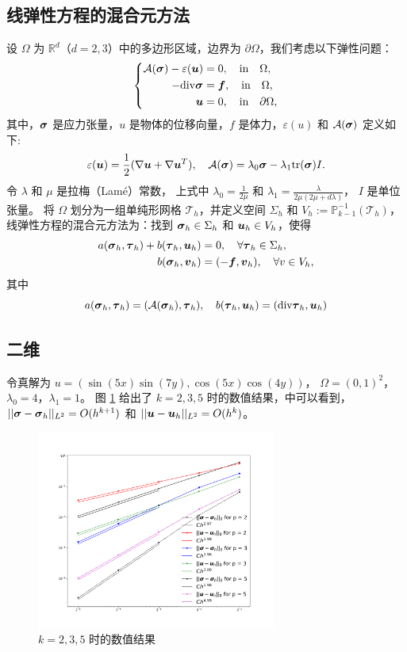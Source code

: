 \documentclass[letterpaper,12pt]{article}
\begin{document}
\subsection{线弹性方程的混合元方法}
设 $\Omega$ 为 $\mathbb{R}^d$（$d=2,3$）中的多边形区域，边界为 $\partial \Omega$，我们考虑以下弹性问题：  
$$
\left\{
\begin{aligned}
  \mathcal{A}(\boldsymbol{\sigma}) - \varepsilon(\boldsymbol{u}) & = 0, \quad \text{in} \quad \Omega, \\
  -\mathrm{div}\boldsymbol{\sigma} &= \boldsymbol{f}, \quad \text{in} \quad \Omega, \\
  \boldsymbol{u} &= 0, \quad \text{in} \quad \partial \Omega,
\end{aligned}
\right.
$$  
其中，$\boldsymbol{\sigma}$ 是应力张量，$u$ 是物体的位移向量，$f$ 是体力，$\varepsilon(u)$ 和 
$\mathcal{A}(\boldsymbol{\sigma})$ 定义如下:
$$
\varepsilon(\boldsymbol{u}) = \frac{1}{2}(\nabla \boldsymbol{u} + \nabla \boldsymbol{u}^T),\quad
\mathcal{A}(\boldsymbol{\sigma}) = \lambda_0 \boldsymbol{\sigma} - \lambda_1\mathrm{tr}(\boldsymbol{\sigma}) I.
$$
令 $\lambda$ 和 $\mu$ 是拉梅（Lamé）常数，
上式中 $\lambda_0 = \frac{1}{2\mu}$ 和 $\lambda_1 = \frac{\lambda}{2\mu(2\mu +
d\lambda)}$，
$I$ 是单位张量。  
将 $\Omega$ 划分为一组单纯形网格 $\mathcal{T}_h$，并定义空间 $\Sigma_h$ 和
$V_h := \mathbb{P}_{k-1}^{-1}(\mathcal{T}_h)$，
线弹性方程的混合元方法为：找到 $\boldsymbol{\sigma}_h \in \Sigma_h$ 和 $\boldsymbol{u}_h \in V_h$，使得
\begin{equation}
\begin{aligned}
    a(\boldsymbol{\sigma}_h, \boldsymbol{\tau}_h) + b(\boldsymbol{\tau}_h, \boldsymbol{u}_h) &= 0, \quad \forall \boldsymbol{\tau}_h
    \in \Sigma_h,\\
    b(\boldsymbol{\sigma}_h, \boldsymbol{v}_h) &= (-\boldsymbol{f}, \boldsymbol{v}_h), \quad \forall v \in V_h,
\end{aligned}
\end{equation}
其中
$$
a(\boldsymbol{\sigma}_h, \boldsymbol{\tau}_h) = (\mathcal{A}(\boldsymbol{\sigma}_h), \boldsymbol{\tau}_h), \quad
b(\boldsymbol{\tau}_h, \boldsymbol{u}_h) = (\mathrm{div} \boldsymbol{\tau}_h, \boldsymbol{u}_h) 
$$
\subsection{二维}
令真解为 $u = (\sin(5x)\sin(7y), \cos(5x)\cos(4y))$，
$\Omega = (0, 1)^2$，
$\lambda_0 = 4$，$\lambda_1 = 1$。
图 \ref{fig:k235} 给出了 $k=2, 3, 5$ 时的数值结果，中可以看到，
$||\boldsymbol{\sigma} - \boldsymbol{\sigma}_h||_{L^2} = O(h^{k+1})$ 和 $||\boldsymbol{u} - \boldsymbol{u}_h||_{L^2} =
O(h^k)$。

\begin{figure}[h]
\centering
\includegraphics[width=0.7\textwidth]{./figures/divs.pdf}
\caption{$k=2, 3, 5$ 时的数值结果}
\label{fig:k235}
\end{figure}
\end{document}
